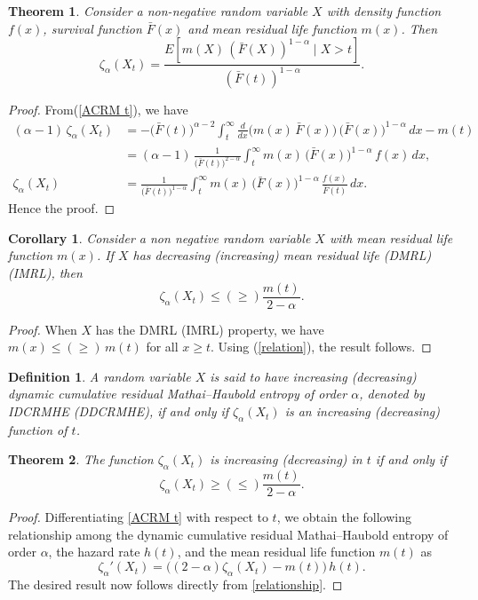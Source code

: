 \documentclass[11pt,reqno]{amsart}
\theoremstyle{tight}
\newtheorem{theorem}{Theorem}[section]
\newtheorem{definition}{Definition}[section]
\newtheorem{corollary}{Corollary}[section]
\begin{document}
\begin{theorem}
 Consider a non-negative random variable $X$ with density function $f(x)$, survival function $\bar{F}(x)$ and mean residual life function $m(x)$. Then
\[
\zeta_{\alpha}(X_t)
= \frac{{E}\!\left[ m(X)\, (\bar{F}(X))^{1-\alpha}\mid X>t \right]}
{(\bar{F}(t))^{1-\alpha}} .
\]
\end{theorem}
\begin{proof}
From(\ref{ACRM t}), we have
\begin{align}
(\alpha-1)\,\zeta_{\alpha}(X_t)
&= - \bigl(\bar{F}(t)\bigr)^{\alpha-2}
\int_{t}^{\infty}
\frac{d}{dx}\!\bigl(m(x)\,\bar{F}(x)\bigr)\,
\bigl(\bar{F}(x)\bigr)^{1-\alpha}\,dx
- m(t) \nonumber\\[6pt]
&= (\alpha-1)\,\frac{1}{\bigl(\bar{F}(t)\bigr)^{2-\alpha}}
\int_{t}^{\infty}
m(x)\,\bigl(\bar{F}(x)\bigr)^{1-\alpha}\,f(x)\,dx , \nonumber\\[6pt]
\zeta_{\alpha}(X_t)
&= \frac{1}{\bigl(\bar{F}(t)\bigr)^{1-\alpha}}
\int_{t}^{\infty}
m(x)\,\bigl(\bar{F}(x)\bigr)^{1-\alpha}\,\frac{f(x)}{\bar{F}(t)}\,dx .\label{relation}
\end{align}
Hence the proof.
\end{proof}
\begin{corollary}
    Consider a non negative random variable $X$ with mean residual life function $m(x)$. If $X$ has decreasing (increasing) mean residual life (DMRL) (IMRL), then
   \[
\zeta_{\alpha}(X_t) \leq (\geq) \frac{m(t)}{2-\alpha}.
\]
\end{corollary}
\begin{proof}
When $X$ has the DMRL (IMRL) property, we have
$m(x) \leq (\geq)\, m(t)$ for all $x \geq t$.
Using (\ref{relation}), the result follows.
\end{proof}
\begin{definition}
A random variable $X$ is said to have increasing (decreasing) dynamic cumulative residual Mathai--Haubold entropy
of order $\alpha$, denoted by IDCRMHE (DDCRMHE), if and only if
$\zeta_{\alpha}(X_t)$ is an increasing (decreasing) function of $t$.

\end{definition}
\begin{theorem}
The function $\zeta_{\alpha}(X_t)$ is increasing (decreasing) in $t$ if and only if
\[
\zeta_{\alpha}(X_t)\geq(\leq)\frac{m(t)}{2-\alpha}.
\]
\end{theorem}
\begin{proof}
   Differentiating \eqref{ACRM t} with respect to $t$, we obtain the following relationship
among the dynamic cumulative residual Mathai--Haubold entropy of order $\alpha$, the hazard rate
$h(t)$, and the mean residual life function $m(t)$ as
\begin{equation}\label{relationship}
\zeta_{\alpha}'(X_t)
=\bigl((2-\alpha)\zeta_{\alpha}(X_t)-m(t)\bigr)\,h(t).
\end{equation}
The desired result now follows directly from \eqref{relationship}.
\end{proof}
\end{document}
